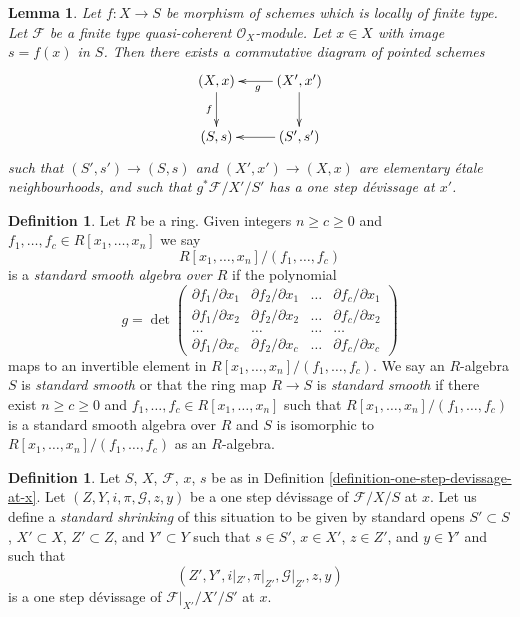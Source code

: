\documentclass{amsart}
\theoremstyle{plain}
\newtheorem{lemma}[subsection]{Lemma}
\theoremstyle{definition}
\newtheorem{definition}[subsection]{Definition}
\theoremstyle{remark}
\numberwithin{equation}{subsection}
\begin{document}
\begin{lemma}
\label{lemma-elementary-devissage-variant}
Let $f : X \to S$ be morphism of schemes which is locally of finite type.
Let $\mathcal{F}$ be a finite type quasi-coherent $\mathcal{O}_X$-module.
Let $x \in X$ with image $s = f(x)$ in $S$.
Then there exists a commutative diagram of pointed schemes
$$
\xymatrix{
(X, x) \ar[d]_f & (X', x') \ar[l]^g \ar[d] \\
(S, s) & (S', s') \ar[l] \\
}
$$
such that $(S', s') \to (S, s)$ and $(X', x') \to (X, x)$
are elementary \'etale neighbourhoods, and such that
$g^*\mathcal{F}/X'/S'$ has a one step d\'evissage at $x'$.
\end{lemma}

\begin{definition}
\label{algebra-definition-standard-smooth}
Let $R$ be a ring. Given integers $n \geq c \geq 0$ and
$f_1, \ldots, f_c \in R[x_1, \ldots, x_n]$ we say
$$
R[x_1, \ldots, x_n]/(f_1, \ldots, f_c)
$$
is a {\it standard smooth algebra over $R$} if the polynomial
$$
g =
\det
\left(
\begin{matrix}
\partial f_1/\partial x_1 &
\partial f_2/\partial x_1 &
\ldots &
\partial f_c/\partial x_1 \\
\partial f_1/\partial x_2 &
\partial f_2/\partial x_2 &
\ldots &
\partial f_c/\partial x_2 \\
\ldots & \ldots & \ldots & \ldots \\
\partial f_1/\partial x_c &
\partial f_2/\partial x_c &
\ldots &
\partial f_c/\partial x_c
\end{matrix}
\right)
$$
maps to an invertible element in $R[x_1, \ldots, x_n]/(f_1, \ldots, f_c)$.
We say an $R$-algebra $S$ is {\it standard smooth} or that
the ring map $R \to S$ is {\it standard smooth} if there exist
$n \geq c \geq 0$ and $f_1, \ldots, f_c \in R[x_1, \ldots, x_n]$
such that $R[x_1, \ldots, x_n]/(f_1, \ldots, f_c)$ is a standard smooth
algebra over $R$ and $S$ is isomorphic to
$R[x_1, \ldots, x_n]/(f_1, \ldots, f_c)$ as an $R$-algebra.
\end{definition}

\begin{definition}
\label{definition-shrink}
Let $S$, $X$, $\mathcal{F}$, $x$, $s$ be as in
Definition \ref{definition-one-step-devissage-at-x}.
Let $(Z, Y, i, \pi, \mathcal{G}, z, y)$ be a one step d\'evissage
of $\mathcal{F}/X/S$ at $x$. Let us define a
{\it standard shrinking} of this situation to be
given by standard opens $S' \subset S$, $X' \subset X$, $Z' \subset Z$,
and $Y' \subset Y$ such that $s \in S'$, $x \in X'$, $z \in Z'$, and
$y \in Y'$ and such that
$$
(Z', Y', i|_{Z'}, \pi|_{Z'}, \mathcal{G}|_{Z'}, z, y)
$$
is a one step d\'evissage of $\mathcal{F}|_{X'}/X'/S'$ at $x$.
\end{definition}
\end{document}
